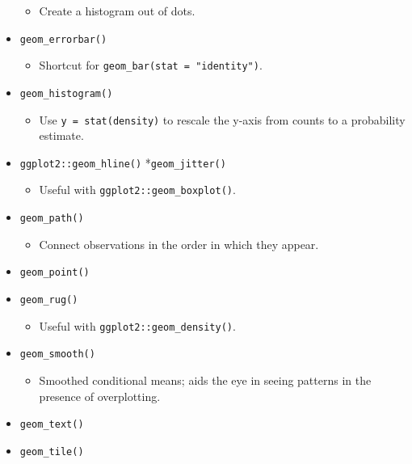 \documentclass[
]{book}
\providecommand{\tightlist}{%
  \setlength{\itemsep}{0pt}\setlength{\parskip}{0pt}}
\begin{document}
\begin{itemize}
  \begin{itemize}
  \tightlist
  \item
    Create a histogram out of dots.
  \end{itemize}
\item
  \texttt{geom\_errorbar()}

  \begin{itemize}
  \tightlist
  \item
    Shortcut for \texttt{geom\_bar(stat\ =\ "identity")}.
  \end{itemize}
\item
  \texttt{geom\_histogram()}

  \begin{itemize}
  \tightlist
  \item
    Use \texttt{y\ =\ stat(density)} to rescale the y-axis from counts to a probability estimate.
  \end{itemize}
\item
  \texttt{ggplot2::geom\_hline()}
  *\texttt{geom\_jitter()}

  \begin{itemize}
  \tightlist
  \item
    Useful with \texttt{ggplot2::geom\_boxplot()}.
  \end{itemize}
\item
  \texttt{geom\_path()}

  \begin{itemize}
  \tightlist
  \item
    Connect observations in the order in which they appear.
  \end{itemize}
\item
  \texttt{geom\_point()}
\item
  \texttt{geom\_rug()}

  \begin{itemize}
  \tightlist
  \item
    Useful with \texttt{ggplot2::geom\_density()}.
  \end{itemize}
\item
  \texttt{geom\_smooth()}

  \begin{itemize}
  \tightlist
  \item
    Smoothed conditional means; aids the eye in seeing patterns in the presence of overplotting.
  \end{itemize}
\item
  \texttt{geom\_text()}
\item
  \texttt{geom\_tile()}


\end{itemize}
\end{document}
